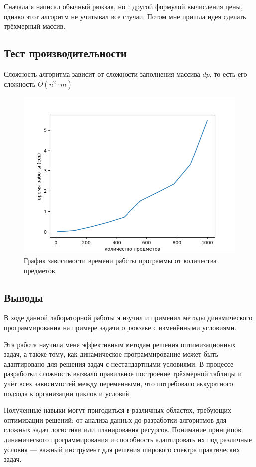 \documentclass[12pt]{article}
\begin{document}
Сначала я написал обычный рюкзак, но с другой формулой вычисления цены, однако этот алгоритм не учитывал все случаи.
Потом мне пришла идея сделать трёхмерный массив.

\newpage
\subsection*{Тест производительности}

Сложность алгоритма зависит от сложности заполнения массива $dp$, то есть его сложность $O(n^2 \cdot m)$
\begin{figure}
    \centering
    \includegraphics[width=\textwidth]{graph.png}
    \caption{График зависимости времени работы программы от количества предметов}
\end{figure}

\subsection*{Выводы}

В ходе данной лабораторной работы я изучил и применил методы динамического программирования на примере
задачи о рюкзаке с изменёнными условиями.

Эта работа научила меня эффективным методам решения оптимизационных задач, а также тому,
как динамическое программирование может быть адаптировано для решения задач с нестандартными условиями.
В процессе разработки сложность вызвало правильное построение трёхмерной таблицы и учёт всех зависимостей
между переменными, что потребовало аккуратного подхода к организации циклов и условий.

Полученные навыки могут пригодиться в различных областях, требующих оптимизации решений:
от анализа данных до разработки алгоритмов для сложных задач логистики или планирования ресурсов.
Понимание принципов динамического программирования и способность адаптировать их под различные условия
— важный инструмент для решения широкого спектра практических задач.
\end{document}
